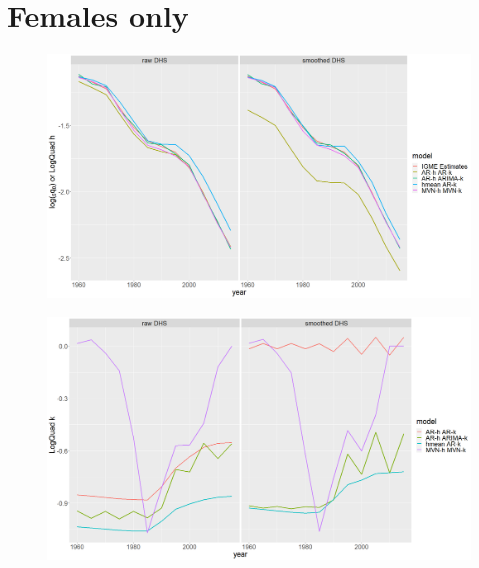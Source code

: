 \documentclass[12pt,a4paper]{article}
\begin{document}
\section*{\centering Females only}
\begin{figure}[H]
\includegraphics[width = \linewidth]{Burkina Faso/7/female h.png}
\end{figure}
\begin{figure}[H]
\includegraphics[width = \linewidth]{Burkina Faso/7/female k.png}
\end{figure}

\newpage
\end{document}
